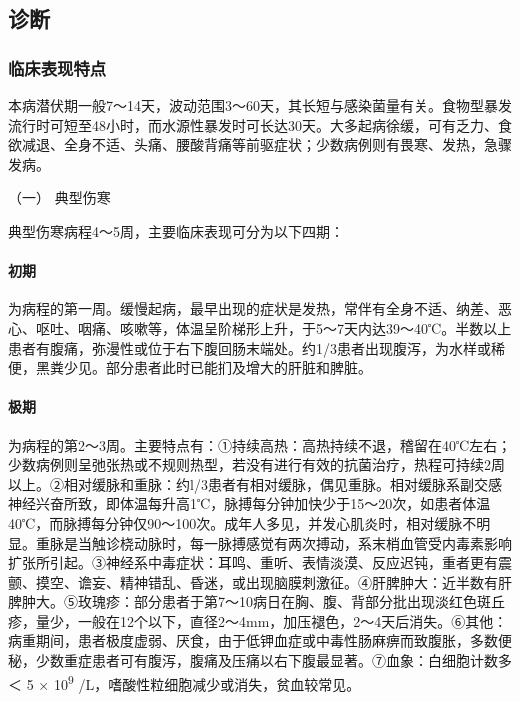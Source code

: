 \subsection{诊断}

\subsubsection{临床表现特点}

本病潜伏期一般7～14天，波动范围3～60天，其长短与感染菌量有关。食物型暴发流行时可短至48小时，而水源性暴发时可长达30天。大多起病徐缓，可有乏力、食欲减退、全身不适、头痛、腰酸背痛等前驱症状；少数病例则有畏寒、发热，急骤发病。

\hypertarget{text00225.htmlux5cux23CHP7-8-2-1-1}{}
（一） 典型伤寒

典型伤寒病程4～5周，主要临床表现可分为以下四期：

\paragraph{初期}

为病程的第一周。缓慢起病，最早出现的症状是发热，常伴有全身不适、纳差、恶心、呕吐、咽痛、咳嗽等，体温呈阶梯形上升，于5～7天内达39～40℃。半数以上患者有腹痛，弥漫性或位于右下腹回肠末端处。约1/3患者出现腹泻，为水样或稀便，黑粪少见。部分患者此时已能扪及增大的肝脏和脾脏。

\paragraph{极期}

为病程的第2～3周。主要特点有：①持续高热：高热持续不退，稽留在40℃左右；少数病例则呈弛张热或不规则热型，若没有进行有效的抗菌治疗，热程可持续2周以上。②相对缓脉和重脉：约l/3患者有相对缓脉，偶见重脉。相对缓脉系副交感神经兴奋所致，即体温每升高1℃，脉搏每分钟加快少于15～20次，如患者体温40℃，而脉搏每分钟仅90～100次。成年人多见，并发心肌炎时，相对缓脉不明显。重脉是当触诊桡动脉时，每一脉搏感觉有两次搏动，系末梢血管受内毒素影响扩张所引起。③神经系中毒症状：耳鸣、重听、表情淡漠、反应迟钝，重者更有震颤、摸空、谵妄、精神错乱、昏迷，或出现脑膜刺激征。④肝脾肿大：近半数有肝脾肿大。⑤玫瑰疹：部分患者于第7～10病日在胸、腹、背部分批出现淡红色斑丘疹，量少，一般在12个以下，直径2～4mm，加压褪色，2～4天后消失。⑥其他：病重期间，患者极度虚弱、厌食，由于低钾血症或中毒性肠麻痹而致腹胀，多数便秘，少数重症患者可有腹泻，腹痛及压痛以右下腹最显著。⑦血象：白细胞计数多＜
5 × 10\textsuperscript{9} /L，嗜酸性粒细胞减少或消失，贫血较常见。

